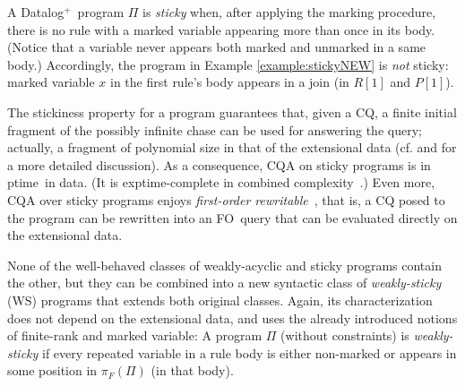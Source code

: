 \documentclass[format=acmsmall, review=false, screen=true]{acmart}
\newcommand{\ignore}[1]{}
\newcommand{\cq}{CQ}
\newcommand{\prg}{\Pi}
\newcommand{\rank}{\pi}
\newcommand{\finiteRank}{\rank_F}
\newcommand{\dplus}{{Datalog}$^+$}
\newcommand{\fo}{FO}
\newcommand{\exptime}{{\sc exptime}}
\newcommand{\ptime}{{\sc ptime}}
\newcommand{\acz}{{\sc ac}$_0$}
\newcommand{\tgd}{{\em tgd}}
\newcommand{\red}[1]{{#1}}
\begin{document}
A \dplus \ program $\prg$ is {\em sticky} when, after applying the marking procedure, there is no rule with a marked variable appearing more than once in its body. (Notice that a variable never appears both marked and unmarked in a  same body.) Accordingly, the program in Example \ref{example:stickyNEW} is {\em not} sticky: marked variable $x$ in the first rule's body appears in a join (in $R[1]$ and $P[1]$).

The stickiness property for a program guarantees that, given a \cq, a finite initial fragment of the possibly infinite chase can be used for answering the query; \ignore{\footnote{\ \red{This is the result of the fact that, with the chase of a \tgd, if a value replaces a join variable in the body, the value is propagated through all the possible subsequent steps and will appear in the query atoms that make it true. Therefore the number of nulls is limited by the number of $\exists$-variables in the query. Cf. \cite{milani16rr} for a more detailed discussion.}}} actually, a fragment of polynomial size in that of the extensional data \red{(cf. \cite{cali12} and \cite{milani16rr} for a more detailed discussion)}. As a consequence,
CQA  on sticky programs is in \ptime \ in data. (It is \exptime-complete in combined complexity~\cite{cali12}.) Even more, CQA  over sticky programs enjoys {\em first-order rewritable}~\cite{gottlob11}, that is,
  a CQ posed to the program can be rewritten into an \fo \ query that can be evaluated directly on the extensional data. \ignore{This makes CQA belong to the tractable class \acz \ (in data complexity)~\cite{vardi}.}
\ignore{  Sticky programs can have an infinite chase, but given a CQ only a finite, initial, query-dependent  fragment of it suffices to answer the query.}



None of the well-behaved classes of weakly-acyclic and sticky programs contain the other, but they can be combined into a new syntactic class of {\em weakly-sticky} (WS) programs that extends both original classes.  Again, its characterization does not depend on the extensional data, and uses the already introduced notions of finite-rank and marked variable: A program $\prg$ (without constraints) is {\em weakly-sticky} if every repeated variable in a
rule body is either non-marked  or appears in some position in $\finiteRank(\prg)$ (in that body).
\end{document}
